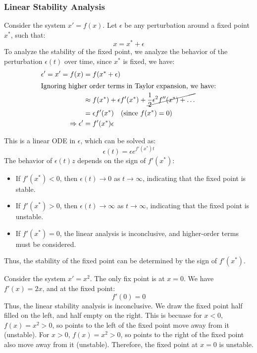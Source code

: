 \documentclass[11pt]{article}
\begin{document}
\subsubsection{Linear Stability Analysis}

\begin{definition} \label{def:linear-stability-analysis}
    Consider the system $x' = f(x)$. Let $\epsilon$ be any perturbation around a fixed point $x^*$, such that:
    $$x = x^* + \epsilon
    $$
    To analyze the stability of the fixed point, we analyze the behavior of the perturbation $\epsilon(t)$ over time, since $x^*$ is fixed, we have:
    \begin{align*}
        \epsilon' = x' = f(x) &= f(x^* + \epsilon) \\
        \intertext{Ignoring higher order terms in Taylor expansion, we have:}
        &\approx f(x^*) + \epsilon f'(x^*) + \cancel{\frac{1}{2} \epsilon^2 f''(x^*) + \ldots} \\
        &= \epsilon f'(x^*) \quad \text{(since } f(x^*) = 0 \text{)} \\
        \Rightarrow \epsilon' &= f'(x^*) \epsilon
    \end{align*}

    This is a linear ODE in $\epsilon$, which can be solved as:
    $$\epsilon(t) = \epsilon e^{f'(x^*) t}
    $$
    The behavior of $\epsilon(t)z$ depends on the sign of $f'(x^*)$:
    \begin{itemize}
        \item If $f'(x^*) < 0$, then $\epsilon(t) \to 0$ as $t \to \infty$, indicating that the fixed point is stable.
        \item If $f'(x^*) > 0$, then $\epsilon(t) \to \infty$ as $t \to \infty$, indicating that the fixed point is unstable.
        \item If $f'(x^*) = 0$, the linear analysis is inconclusive, and higher-order terms must be considered.
    \end{itemize}
    Thus, the stability of the fixed point can be determined by the sign of $f'(x^*)$.
\end{definition}

\begin{example}
    Consider the system $x' =x^2$. The only fix point is at \( x = 0 \). We have $f'(x) = 2x$, and at the fixed point:
    $$
    f'(0) = 0
    $$
    Thus, the linear stability analysis is inconclusive. We draw the fixed point half filled on the left, and half empty on the right. This is becuase for \( x < 0 \), \( f(x) = x^2 > 0 \), so points to the left of the fixed point move away from it (unstable). For \( x > 0 \), \( f(x) = x^2 > 0 \), so points to the right of the fixed point also move away from it (unstable). Therefore, the fixed point at \( x = 0 \) is unstable.
\end{example}
\end{document}
